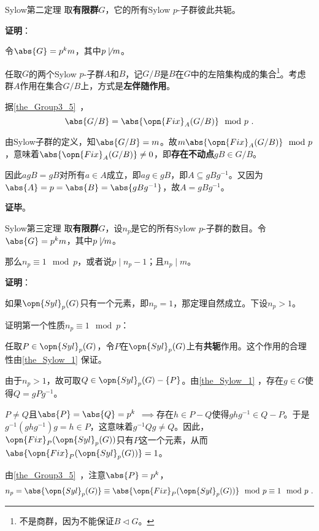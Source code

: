 \begin{theorem}{Sylow第二定理}\label{the_Sylow_1}
取\textbf{有限群}$G$，它的所有Sylow $p$-子群彼此共轭。
\end{theorem}

\textbf{证明}：

令$\abs{G}=p^km$，其中$p\not\mid m$。

任取$G$的两个Sylow $p$-子群$A$和$B$，记$G/B$是$B$在$G$中的左陪集构成的集合\footnote{不是商群，因为不能保证$B\vartriangleleft G$。}。考虑群$A$作用在集合$G/B$上，方式是\textbf{左伴随作用}。

据\autoref{the_Group3_5}~，
\begin{equation}
\abs{G/B} = \abs{\opn{Fix}_A(G/B)} \mod p~.
\end{equation}

由Sylow子群的定义，知$\abs{G/B}=m$。故$m\abs{\opn{Fix}_A(G/B)} \mod p$，意味着$\abs{\opn{Fix}_A(G/B)}\neq 0$，即\textbf{存在不动点}$gB\in G/B$。

因此$agB=gB$对所有$a\in A$成立，即$ag\in gB$，即$A\subseteq gBg^{-1}$。又因为$\abs{A}=p=\abs{B}=\abs{gBg^{-1}}$，故$A=gBg^{-1}$。


\textbf{证毕}。




\begin{theorem}{Sylow第三定理}\label{the_Sylow_2}
取\textbf{有限群}$G$，设$n_p$是它的所有Sylow $p$-子群的数目。令$\abs{G}=p^km$，其中$p\not\mid m$。

那么$n_p\equiv 1\mod p$，或者说$p\mid n_p-1$；且$n_p\mid m$。
\end{theorem}

\textbf{证明}：

如果$\opn{Syl}_p(G)$只有一个元素，即$n_p=1$，那定理自然成立。下设$n_p>1$。


证明第一个性质$n_p\equiv 1\mod p$：

任取$P\in\opn{Syl}_p(G)$，令$P$在$\opn{Syl}_p(G)$上有\textbf{共轭}作用。这个作用的合理性由\autoref{the_Sylow_1} 保证。

由于$n_p>1$，故可取$Q\in \opn{Syl}_p(G)-\{P\}$。由\autoref{the_Sylow_1} ，存在$g\in G$使得$Q=gPg^{-1}$。

$P\neq Q$且$\abs{P}=\abs{Q}=p^k$ $\implies$存在$h\in P-Q$使得$ghg^{-1}\in Q-P$。于是$g^{-1}(ghg^{-1})g=h\in P$，这意味着$g^{-1}Qg\neq Q$。因此，$\opn{Fix}_P(\opn{Syl}_p(G))$只有$P$这一个元素，从而$\abs{\opn{Fix}_P(\opn{Syl}_p(G))}=1$。

由\autoref{the_Group3_5}~，注意$\abs{P}=p^k$，
\begin{equation}\label{eq_Sylow_1}
\begin{aligned}
n_p=\abs{\opn{Syl}_p(G)}\equiv\abs{\opn{Fix}_P(\opn{Syl}_p(G))}\mod p\equiv 1\mod p~.
\end{aligned}
\end{equation}



